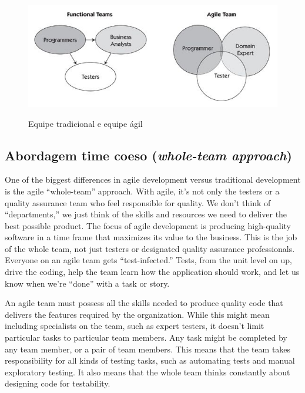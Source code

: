 \documentclass[
	12pt,				%
	openright,			%
	oneside,			%
	a4paper,			%
	english,			%
	brazil,				%
	]{abntex2}
\begin{document}

\begin{figure}[H]
    \centering
    \caption{Equipe tradicional e equipe ágil}
    \graphicspath{ {./graphics/agile/} }
    \includegraphics[scale=1.0]{functional-and-agile-teams}
    \label{fig:functional-and-agile-teams}
\end{figure}

\subsection{Abordagem time coeso (\emph{whole-team approach})}

One of the biggest differences in agile development versus traditional development is the agile “whole-team” approach. With agile, it’s not only the testers or a quality assurance team who feel responsible for quality. We don’t think of “departments,” we just think of the skills and resources we need to deliver the best possible product. The focus of agile development is producing high-quality software in a time frame that maximizes its value to the business. This is the job of the whole team, not just testers or designated quality assurance professionals. Everyone on an agile team gets “test-infected.” Tests, from the unit level on up, drive the coding, help the team learn how the application should work, and let us know when we’re “done” with a task or story.

An agile team must possess all the skills needed to produce quality code that delivers the features required by the organization. While this might mean including specialists on the team, such as expert testers, it doesn’t limit particular tasks to particular team members. Any task might be completed by any team member, or a pair of team members. This means that the team takes responsibility for all kinds of testing tasks, such as automating tests and manual exploratory testing. It also means that the whole team thinks constantly about designing code for testability.
\end{document}
